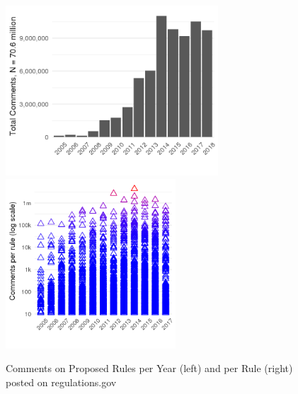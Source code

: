 \begin{figure}
\caption{Comments on Proposed Rules per Year (left) and per Rule (right) posted on regulations.gov}
\centering
\includegraphics[height= 2.5in]{Figs/comments-per-year-1.png}
\includegraphics[height= 2.5in]{Figs/rules-comments-per-year-1.png}
\label{fig:comments}
\end{figure}












